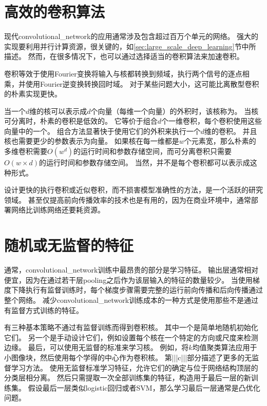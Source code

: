 \section{高效的卷积算法}
\label{sec:efficient_convolution_algorithms}

现代\gls{convolutional_network}的应用通常涉及包含超过百万个单元的网络。
强大的实现要利用并行计算资源，很关键的，如\ref{sec:large_scale_deep_learning}节中所描述。
然而，在很多情况下，也可以通过选择适当的卷积算法来加速卷积。
 
 
卷积等效于使用Fourier变换将输入与核都转换到频域，执行两个信号的逐点相乘，并使用Fourier逆变换转换回时域。
对于某些问题大小，这可能比离散型卷积的朴素实现更快。

当一个$d$维的核可以表示成$d$个向量（每维一个向量）的外积时，该核称为。
当核可分离时，朴素的卷积是低效的。
它等价于组合$d$个一维卷积，每个卷积使用这些向量中的一个。
组合方法显著快于使用它们的外积来执行一个$d$维的卷积。
并且核也需要更少的参数表示为向量。
如果核在每一维都是$w$个元素宽，那么朴素的多维卷积需要$O(w^d)$的运行时间和参数存储空间，而可分离卷积只需要$O(w\times d)$的运行时间和参数存储空间。
当然，并不是每个卷积都可以表示成这种形式。

设计更快的执行卷积或近似卷积，而不损害模型准确性的方法，是一个活跃的研究领域。 
甚至仅提高前向传播效率的技术也是有用的，因为在商业环境中，通常部署网络比训练网络还要耗资源。

\section{随机或无监督的特征}
\label{sec:random_or_unsupervised_features}

通常，\gls{convolutional_network}训练中最昂贵的部分是学习特征。 
输出层通常相对便宜，因为在通过若干层\gls{pooling}之后作为该层输入的特征的数量较少。
当使用梯度下降执行有监督训练时，每个梯度步骤需要完整的运行前向传播和后向传播通过整个网络。
减少\gls{convolutional_network}训练成本的一种方式是使用那些不是通过有监督方式训练的特征。

有三种基本策略不通过有监督训练而得到卷积核。
其中一个是简单地随机初始化它们。
另一个是手动设计它们，例如设置每个核在一个特定的方向或尺度来检测边缘。
最后，可以使用无监督的标准来学习核。
例如，\cite{Coates2011}将$k$均值聚类算法应用于小图像块，然后使用每个学得的中心作为卷积核。
第|||c|||部分描述了更多的无监督学习方法。
使用无监督标准学习特征，允许它们的确定与位于网络结构顶层的分类层相分离。
然后只需提取一次全部训练集的特征，构造用于最后一层的新训练集。
假设最后一层类似logistic回归或者SVM，那么学习最后一层通常是凸优化问题。
 
